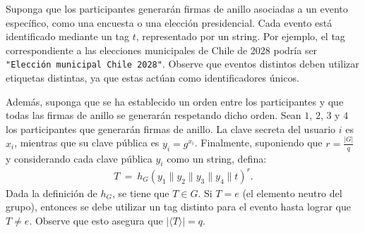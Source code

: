 Suponga que los participantes generarán firmas de anillo asociadas a un evento específico,
como una encuesta o una elección presidencial. Cada evento está identificado mediante un tag $t$,
representado por un string. Por ejemplo, el tag correspondiente a las
elecciones municipales de Chile de 2028 podría ser \texttt{"Elección municipal Chile 2028"}.
Observe que eventos distintos deben utilizar etiquetas distintas, ya que estas actúan como
identificadores únicos.

Además, suponga que se ha establecido un orden entre los participantes y que todas las firmas
de anillo se generarán respetando dicho orden. Sean $1$, $2$, $3$ y $4$ los participantes que
generarán firmas de anillo. La clave secreta del usuario $i$ es $x_i$, mientras que su clave
pública es $y_i = g^{x_i}$. Finalmente, suponiendo que $r = \frac{|G|}{q}$ y considerando
cada clave pública $y_i$ como un string, defina:
\begin{align*}
T \ = \ h_G(y_1 \| y_2 \| y_3 \| y_4 \| t)^r.
\end{align*}
Dada la definición de $h_G$, se tiene que $T \in G$. Si $T = e$ (el elemento neutro del grupo), entonces
se debe utilizar un tag distinto para el evento hasta lograr que $T \neq e$. Observe que esto asegura que
$|\langle T \rangle| = q$.

